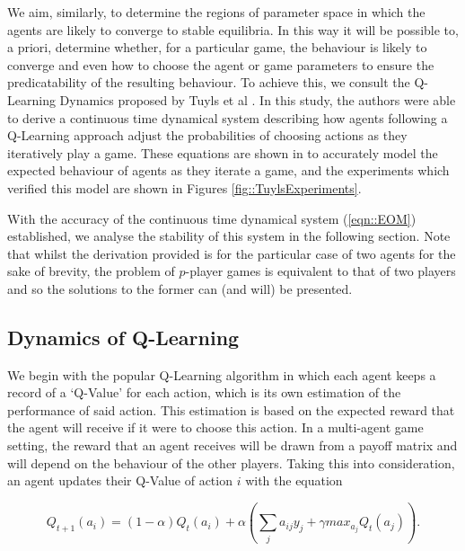 \documentclass[.../main.tex]{subfiles}
\begin{document}
    We aim, similarly, to determine the regions of parameter space in
    which the agents are likely to converge to stable equilibria. In
    this way it will be possible to, a priori, determine whether, for
    a particular game, the behaviour is likely to converge and even
    how to choose the agent or game parameters to ensure the
    predicatability of the resulting behaviour. To achieve this, we
    consult the Q-Learning Dynamics proposed by Tuyls et al
    \cite{Tuyls2006AnGames}. In this study, the authors were able to
    derive a continuous time dynamical system describing how agents
    following a Q-Learning approach adjust the probabilities of
    choosing actions as they iteratively play a game. These equations
    are shown in \cite{Tuyls2006AnGames} to accurately model the
    expected behaviour of agents as they iterate a game, and the
    experiments which verified this model are shown in Figures
    \ref{fig::TuylsExperiments}.

    With the accuracy of the continuous time dynamical system
    (\ref{eqn::EOM}) established, we analyse the stability of this
    system in the following section. Note that whilst the derivation
    provided is for the particular case of two agents for the sake of
    brevity, the problem of $p$-player games is equivalent to that of
    two players and so the solutions to the former can (and will) be
    presented.

    
    \subsection{Dynamics of Q-Learning} %
    \label{sub:dynamics_of_q_learning}
    
    We begin with the popular Q-Learning algorithm in which each agent keeps a record of a `Q-Value'
    for each action, which is its own estimation of the performance of said action. This estimation
    is based on the expected reward that the agent will receive if it were to choose this action. In
    a multi-agent game setting, the reward that an agent receives will be drawn from a payoff
    matrix and will depend on the behaviour of the other players. Taking this into consideration,
    an agent updates their Q-Value of action $i$ with the equation

    \begin{equation}
    \label{eq::Q-Learning}
    Q_{t+1}(a_i) = (1 - \alpha) Q_t(a_i) + \alpha (\sum_j a_{ij} y_{j} + \gamma max_{a_j}Q_t(a_j)).
    \end{equation}
\end{document}
